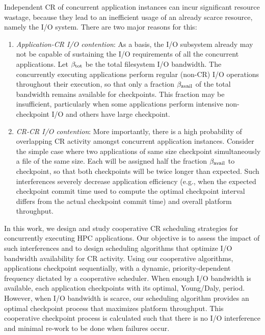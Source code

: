 Independent CR of concurrent application instances can incur significant resource
wastage, because they lead to an inefficient usage of an already scarce resource,
namely the I/O system.  There are two major reasons for this:
\begin{enumerate}
\item \emph{Application-CR I/O contention}: As a basis, the I/O subsystem already may
  not be capable of sustaining the I/O requirements of all the concurrent
  applications.  Let $\beta_{\text{tot}}$ be the total filesystem I/O bandwidth.  The
  concurrently executing applications perform regular (non-CR) I/O operations
  throughout their execution, so that only a fraction $\beta_{\text{avail}}$ of the total
  bandwidth remains available for checkpoints.  This fraction may be insufficient,
  particularly when some applications perform intensive non-checkpoint I/O and others
  have large checkpoint.

\item \emph{CR-CR I/O contention}: More importantly, there is a high probability of
  overlapping CR activity amongst concurrent application instances.
  Consider the simple case where two applications of same size checkpoint simultaneously a file of
  the same size. Each will be assigned half the fraction $\beta_{\text{avail}}$ to checkpoint,
  so that both checkpoints will be twice longer than expected. Such interferences
  severely decrease application efficiency (e.g., when the expected checkpoint commit
  time used to compute the optimal checkpoint interval differs from the actual
  checkpoint commit time) and overall platform throughput.
\end{enumerate}

In this work, we design and study cooperative CR scheduling strategies for concurrently
executing HPC applications.  Our objective is to assess the impact of such
interferences and to design scheduling algorithms that optimize I/O bandwidth
availability for CR activity.  Using our cooperative algorithms, applications checkpoint
sequentially, with a dynamic, priority-dependent frequency dictated by a cooperative
scheduler.  When enough I/O bandwidth is available, each application checkpoints with
its optimal, Young/Daly, period. However, when I/O bandwidth is scarce, our
scheduling algorithm provides an optimal checkpoint process that maximizes platform
throughput. This cooperative checkpoint process is calculated such that there is no
I/O interference and minimal re-work to be done when failures occur.

